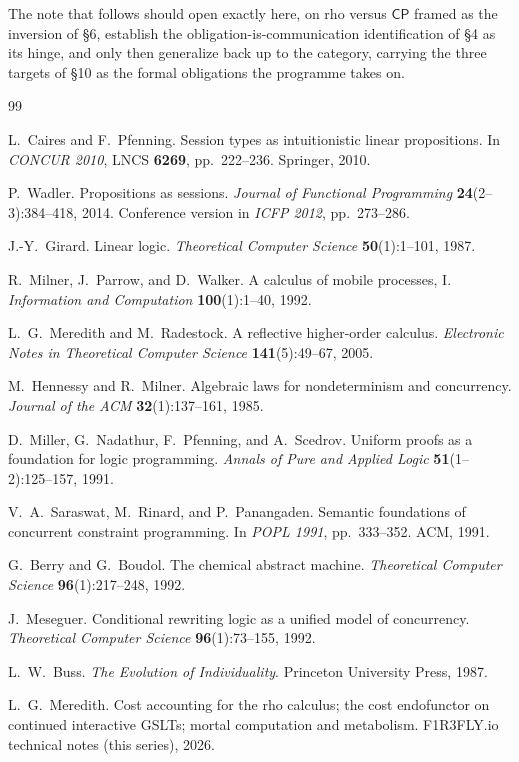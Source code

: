 \documentclass[11pt]{article}
\theoremstyle{plain}
\theoremstyle{definition}
\theoremstyle{remark}
\newcommand{\CP}{\textsf{CP}}
\begin{document}
The note that follows should open exactly here, on rho versus $\CP$ framed as
the inversion of \S6, establish the obligation-is-communication identification
of \S4 as its hinge, and only then generalize back up to the category, carrying
the three targets of \S10 as the formal obligations the programme takes on.

\begin{thebibliography}{99}

L.~Caires and F.~Pfenning.
\newblock Session types as intuitionistic linear propositions.
\newblock In \emph{CONCUR 2010}, LNCS \textbf{6269}, pp.~222--236. Springer, 2010.

P.~Wadler.
\newblock Propositions as sessions.
\newblock \emph{Journal of Functional Programming} \textbf{24}(2--3):384--418,
2014. Conference version in \emph{ICFP 2012}, pp.~273--286.

J.-Y.~Girard.
\newblock Linear logic.
\newblock \emph{Theoretical Computer Science} \textbf{50}(1):1--101, 1987.

R.~Milner, J.~Parrow, and D.~Walker.
\newblock A calculus of mobile processes, I.
\newblock \emph{Information and Computation} \textbf{100}(1):1--40, 1992.

L.~G.~Meredith and M.~Radestock.
\newblock A reflective higher-order calculus.
\newblock \emph{Electronic Notes in Theoretical Computer Science}
\textbf{141}(5):49--67, 2005.

M.~Hennessy and R.~Milner.
\newblock Algebraic laws for nondeterminism and concurrency.
\newblock \emph{Journal of the ACM} \textbf{32}(1):137--161, 1985.

D.~Miller, G.~Nadathur, F.~Pfenning, and A.~Scedrov.
\newblock Uniform proofs as a foundation for logic programming.
\newblock \emph{Annals of Pure and Applied Logic} \textbf{51}(1--2):125--157, 1991.

V.~A.~Saraswat, M.~Rinard, and P.~Panangaden.
\newblock Semantic foundations of concurrent constraint programming.
\newblock In \emph{POPL 1991}, pp.~333--352. ACM, 1991.

G.~Berry and G.~Boudol.
\newblock The chemical abstract machine.
\newblock \emph{Theoretical Computer Science} \textbf{96}(1):217--248, 1992.

J.~Meseguer.
\newblock Conditional rewriting logic as a unified model of concurrency.
\newblock \emph{Theoretical Computer Science} \textbf{96}(1):73--155, 1992.

L.~W.~Buss.
\newblock \emph{The Evolution of Individuality}.
\newblock Princeton University Press, 1987.

L.~G.~Meredith.
\newblock Cost accounting for the rho calculus; the cost endofunctor on
continued interactive GSLTs; mortal computation and metabolism.
\newblock F1R3FLY.io technical notes (this series), 2026.

\end{thebibliography}
\end{document}
